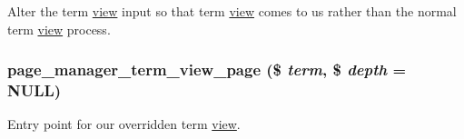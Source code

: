 Alter the term \hyperlink{classview}{view} input so that term \hyperlink{classview}{view} comes to us rather than the normal term \hyperlink{classview}{view} process. \hypertarget{term__view_8inc_a38a32406ae3dbe2490d7176e933714f0}{
\subsubsection[{page\_\-manager\_\-term\_\-view\_\-page}]{\setlength{\rightskip}{0pt plus 5cm}page\_\-manager\_\-term\_\-view\_\-page (\$ {\em term}, \/  \$ {\em depth} = {\ttfamily NULL})}}
\label{term__view_8inc_a38a32406ae3dbe2490d7176e933714f0}
Entry point for our overridden term \hyperlink{classview}{view}.

